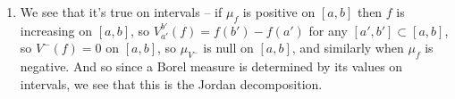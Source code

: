 \documentclass{article}
\begin{document}
\begin{enumerate}
   \item We see that it's true on intervals -- if $\mu_f$ is positive on $[a,b]$
      then $f$ is increasing on $[a,b]$, so $V_{a'}^{b'}(f) = f(b')-f(a')$ for
      any $[a',b'] \subset [a,b]$, so $V^-(f) = 0$ on $[a,b]$, so $\mu_{V^-}$ is
      null on $[a,b]$, and similarly when $\mu_f$ is negative. And so since a
      Borel measure is determined by its values on intervals, we see that this
      is the Jordan decomposition.

\end{enumerate}
\end{document}
